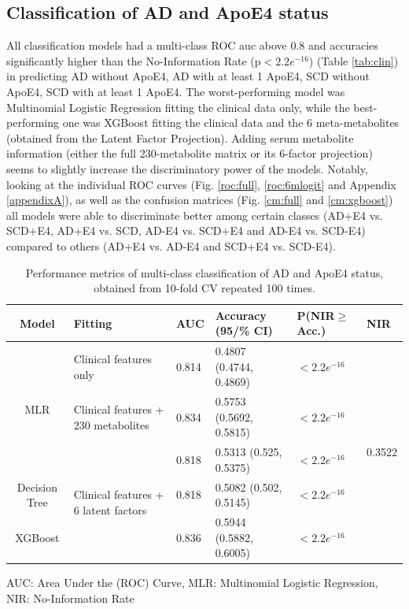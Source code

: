 \documentclass{amsart}
\begin{document}
\subsection{Classification of AD and ApoE4 status}
All classification models had a multi-class ROC \acrshort{auc} above 0.8 and accuracies significantly higher than the No-Information Rate (p$<2.2e^{-16}$) (Table \ref{tab:clin}) in predicting AD without ApoE4, AD with at least 1 ApoE4, SCD without ApoE4, SCD with at least 1 ApoE4. The worst-performing model was  Multinomial Logistic Regression fitting the clinical data only, while the best-performing one was XGBoost fitting the clinical data and the 6 meta-metabolites (obtained from the Latent Factor Projection). Adding serum metabolite information (either the full 230-metabolite matrix or its 6-factor projection) seems to slightly increase the discriminatory power of the models.
Notably, looking at the individual ROC curves (Fig. \ref{roc:full}, \ref{roc:6mlogit} and Appendix \ref{appendixA}), as well as the confusion matrices (Fig. \ref{cm:full} and \ref{cm:xgboost}) all models were able to discriminate better among certain classes (AD+E4 vs. SCD+E4, AD+E4 vs. SCD, AD-E4 vs. SCD+E4 and AD-E4 vs. SCD-E4) compared to others (AD+E4 vs. AD-E4 and SCD+E4 vs. SCD-E4).
\begin{table}[H]
  \centering
\caption{Performance metrics of multi-class classification of AD and ApoE4 status, obtained from 10-fold CV repeated 100 times.} 
\label{tab:class_results}
\begin{threeparttable}
\begin{tabular}{clllll}\toprule
Model  & Fitting & AUC & Accuracy (95/\% CI) & P(NIR$\geq$Acc.) & NIR \\ \midrule
\multirow{3}{*}{MLR} & Clinical features only & 0.814 & 0.4807 (0.4744, 0.4869) & $<2.2e^{-16}$ & \multirow{5}{*}{0.3522} \\
& Clinical features + 230 metabolites & 0.834 & 0.5753 (0.5692, 0.5815) & $<2.2e^{-16}$ &  \\
& \multirow{3}{*}{Clinical features + 6 latent factors} & 0.818 & 0.5313 (0.525, 0.5375) & $<2.2e^{-16}$ &  \\
Decision Tree & & 0.818 & 0.5082 (0.502, 0.5145) & $<2.2e^{-16}$ &  \\
XGBoost & & 0.836 & 0.5944 (0.5882, 0.6005) & $<2.2e^{-16}$ &  \\ \bottomrule
\end{tabular}
\begin{tablenotes}
  \item[]  AUC: Area Under the (ROC) Curve, MLR: Multinomial Logistic Regression, NIR: No-Information Rate
\end{tablenotes}
\end{threeparttable}
\end{table}
\end{document}
